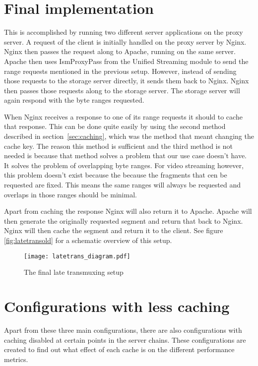\documentclass[twoside,openright]{uva-bachelor-thesis}
\begin{document}
\section{Final implementation}
This is accomplished by running two different server applications on
the proxy server. A request of the client is initially handled on the proxy
server by Nginx. Nginx then passes the request along to Apache, running on the
same server. Apache then uses IsmProxyPass from the Unified Streaming module to
send the range requests mentioned in the previous setup.  However,
instead of sending those requests to the storage server directly, it sends them
back to Nginx. Nginx then passes those requests along to the storage server. The
storage server will again respond with the byte ranges requested.

When Nginx receives a response to one of its range requests it should to cache
that response. This can be done quite easily by using the second method
described in section~\vref{sec:caching}, which was the method that meant
changing the cache key. The reason this method is sufficient and the third
method is not needed is because that method solves a problem that our use case
doesn't have.  It solves the problem of overlapping byte ranges. For video
streaming however, this problem doesn't exist because the because the fragments
that cen be requested are fixed. This means the same ranges will always be
requested and overlaps in those ranges should be minimal.

Apart from caching the response Nginx will also return it to Apache. Apache will
then generate the originally requested segment and return that back to Nginx.
Nginx will then cache the segment and return it to the client. See figure
\vref{fig:latetransold} for a schematic overview of this setup.

\begin{figure}
    \texttt{[image: latetrans\_diagram.pdf]}
    \caption{The final late transmuxing setup}\label{fig:latetrans}
\end{figure}


\section{Configurations with less caching}
Apart from these three main configurations, there are also configurations
with caching disabled at certain points in the server chains. These
configurations are created to find out what effect of each cache is on the
different performance metrics.
\end{document}

